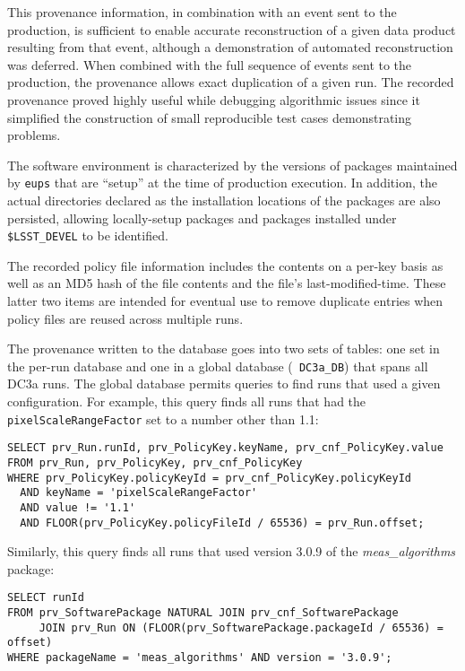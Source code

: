 This provenance information, in combination with an event sent to the
production, is sufficient to enable accurate reconstruction of a given
data product resulting from that event, although a demonstration of
automated reconstruction was deferred.  When combined with the full
sequence of events sent to the production, the provenance allows exact
duplication of a given run.  The recorded provenance proved highly
useful while debugging algorithmic issues since it simplified the
construction of small reproducible test cases demonstrating problems.
\iffalse
\RHL{My impression was that we didn't yet have the ability to 
down the stage configuration associated with an error, or
is this what, ``a demonstration of 
automated reconstruction was deferred''?}
KTL - We can get the configuration easily.  What is not so readily
available is the inputs to a given stage, many of which may not be
pipeline data products (they are just internal).  This is why the text
says "simplified" and not "automatically enabled".  The clipboard inputs
can always be re-created by re-running the pipeline, but this may be
inconvenient and inefficient.
\fi

The software environment is characterized by the versions of packages
maintained by {\tt eups} that are ``setup'' at the time of production
execution.  In addition, the actual directories declared as the
installation locations of the packages are also persisted, allowing
locally-setup packages and packages installed under {\tt \$LSST\_DEVEL} to
be identified.

The recorded policy file information includes the contents on a per-key
basis as well as an MD5 hash of the file contents and the file's
last-modified-time.  These latter two items are intended for eventual
use to remove duplicate entries when policy files are reused across
multiple runs.

The provenance written to the database goes into two sets of tables: one
set in the per-run database and one in a global database ({\tt
DC3a\_DB}) that spans all DC3a runs.  The global database permits
queries to find runs that used a given configuration.  For example, this
query finds all runs that had the {\tt pixelScaleRangeFactor} set to a
number other than 1.1:

\begin{verbatim}
SELECT prv_Run.runId, prv_PolicyKey.keyName, prv_cnf_PolicyKey.value
FROM prv_Run, prv_PolicyKey, prv_cnf_PolicyKey
WHERE prv_PolicyKey.policyKeyId = prv_cnf_PolicyKey.policyKeyId
  AND keyName = 'pixelScaleRangeFactor'
  AND value != '1.1'
  AND FLOOR(prv_PolicyKey.policyFileId / 65536) = prv_Run.offset;
\end{verbatim}

Similarly, this query finds all runs that used version 3.0.9 of the {\it
meas\_algorithms} package:

\begin{verbatim}
SELECT runId
FROM prv_SoftwarePackage NATURAL JOIN prv_cnf_SoftwarePackage
     JOIN prv_Run ON (FLOOR(prv_SoftwarePackage.packageId / 65536) = offset)
WHERE packageName = 'meas_algorithms' AND version = '3.0.9';
\end{verbatim}

